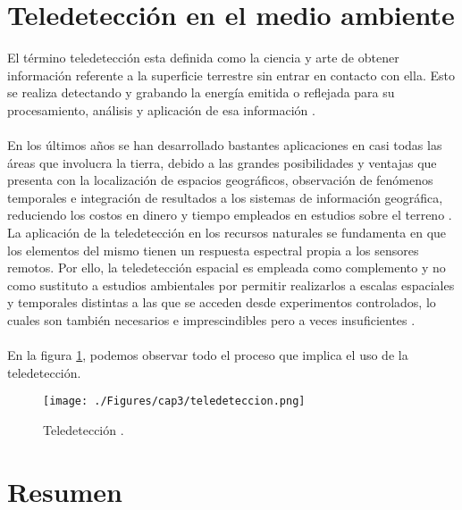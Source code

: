 \section{Teledetecci\'on en el medio ambiente}
El t\'ermino teledetecci\'on esta definida como la ciencia y arte de obtener informaci\'on referente a la superficie terrestre sin entrar en contacto con ella. Esto se realiza detectando y grabando la energ\'ia emitida o reflejada para su procesamiento, an\'alisis y aplicaci\'on de esa informaci\'on \cite{salinero2002teledeteccion}.\\~\\
En los \'ultimos a\~{n}os se han desarrollado bastantes aplicaciones en casi todas las \'areas que involucra la tierra, debido a las grandes posibilidades y ventajas que presenta con la localizaci\'on de espacios geogr\'aficos, observaci\'on de fen\'omenos temporales e integraci\'on de resultados a los sistemas de informaci\'on geogr\'afica, reduciendo los costos en dinero y tiempo empleados en estudios sobre el terreno \cite{baker2006mapping}. La aplicaci\'on de la teledetecci\'on en los recursos naturales se fundamenta en que los elementos del mismo tienen un respuesta espectral propia a los sensores remotos. Por ello, la teledetecci\'on espacial es empleada como complemento y no como sustituto a estudios ambientales por permitir realizarlos a escalas espaciales y temporales distintas a las que se acceden desde experimentos controlados, lo cuales son tambi\'en necesarios e imprescindibles pero a veces insuficientes \cite{perez2011aplicaciones}.\\~\\
En la figura \ref{fig:tele}, podemos observar todo el proceso que implica el uso de la teledetecci\'on.

	\begin{figure}[H]
		\centering
		\texttt{[image: ./Figures/cap3/teledeteccion.png]}
		\caption{Teledetecci\'on \cite{teledet2015perce}.}
		\label{fig:tele}
	\end{figure}

\section{Resumen}

